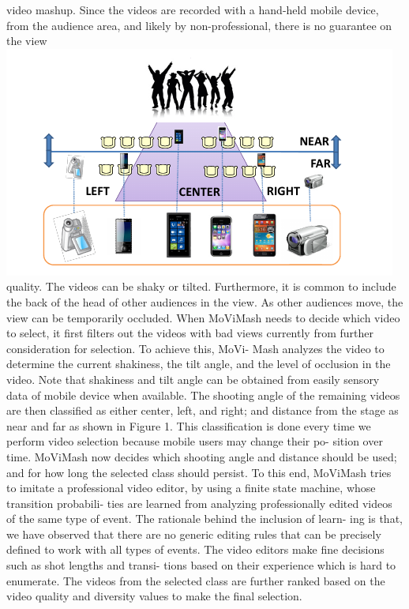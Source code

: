 \documentclass{sig-alternate}
\begin{document}
video mashup.
Since the videos are recorded with a hand-held mobile device,
from the audience area, and likely by non-professional, there is no
guarantee on the view \includegraphics[scale=1]{one.pdf}\\
quality. The videos can be shaky or tilted.
Furthermore, it is common to include the back of the head of other
audiences in the view. As other audiences move, the view can be
temporarily occluded. When MoViMash needs to decide which
video to select, it first filters out the videos with bad views currently
from further consideration for selection. To achieve this, MoVi-
Mash analyzes the video to determine the current shakiness, the tilt
angle, and the level of occlusion in the video. Note that shakiness
and tilt angle can be obtained from easily sensory data of mobile
device when available.
The shooting angle of the remaining videos are then classified as
either center, left, and right; and distance from the stage as near and
far as shown in Figure 1. This classification is done every time we
perform video selection because mobile users may change their po-
sition over time. MoViMash now decides which shooting angle and
distance should be used; and for how long the selected class should
persist. To this end, MoViMash tries to imitate a professional video
editor, by using a finite state machine, whose transition probabili-
ties are learned from analyzing professionally edited videos of the
same type of event. The rationale behind the inclusion of learn-
ing is that, we have observed that there are no generic editing rules
that can be precisely defined to work with all types of events. The
video editors make fine decisions such as shot lengths and transi-
tions based on their experience which is hard to enumerate.
The videos from the selected class are further ranked based on
the video quality and diversity values to make the final selection.
\end{document}
